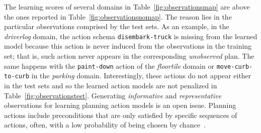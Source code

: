 The learning scores of several domains in Table~\ref{fig:observationsmap} are above the ones reported in Table~\ref{fig:observationsnomap}. The reason lies in the particular observations comprised by the test sets. As an example, in the {\em driverlog} domain, the action schema {\small \tt disembark-truck} is missing from the learned model because this action is never induced from the observations in the training set; that is, such action never appears in the corresponding \emph{unobserved} plan. The same happens with the {\small \tt paint-down} action of the {\em floortile} domain or {\small \tt move-curb-to-curb} in the {\em parking} domain. Interestingly, these actions do not appear either in the test sets and so the learned action models are not penalized in Table~\ref{fig:observationstest}. Generating {\em informative} and {\em representative} observations for learning planning action models is an open issue. Planning actions include preconditions that are only satisfied by specific sequences of actions, often, with a low probability of being chosen by chance~\cite{fern2004learning}.
